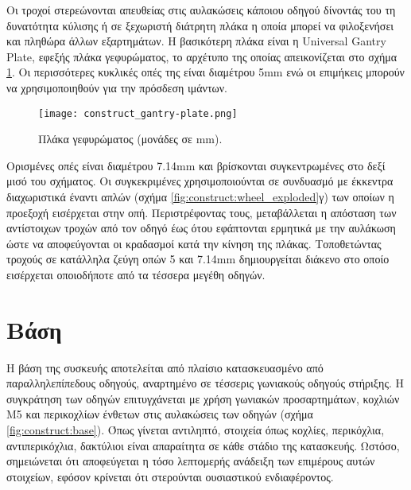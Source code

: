 Οι τροχοί στερεώνονται απευθείας στις αυλακώσεις κάποιου οδηγού δίνοντάς του τη
δυνατότητα κύλισης ή σε ξεχωριστή διάτρητη πλάκα η οποία μπορεί να φιλοξενήσει
και πληθώρα άλλων εξαρτημάτων. Η βασικότερη πλάκα είναι η Universal Gantry
Plate, εφεξής πλάκα γεφυρώματος, το αρχέτυπο της οποίας απεικονίζεται στο σχήμα
\ref{fig:construct:gantry-plate}. Οι περισσότερες κυκλικές οπές της είναι
διαμέτρου 5mm ενώ οι επιμήκεις μπορούν να χρησιμοποιηθούν για την πρόσδεση
ιμάντων.

\begin{figure}
    \caption[Πλάκα γεφυρώματος]{Πλάκα γεφυρώματος (μονάδες σε mm).
    \label{fig:construct:gantry-plate}}
    \begin{center}%
    \texttt{[image: construct\_gantry-plate.png]}%
    \end{center}

\end{figure}

Ορισμένες οπές είναι διαμέτρου 7.14mm και βρίσκονται συγκεντρωμένες στο δεξί
μισό του σχήματος.
Οι συγκεκριμένες χρησιμοποιούνται σε συνδυασμό με έκκεντρα διαχωριστικά έναντι
απλών (σχήμα \ref{fig:construct:wheel_exploded}γ) των οποίων η προεξοχή
εισέρχεται στην οπή. Περιστρέφοντας τους, μεταβάλλεται η απόσταση των
αντίστοιχων τροχών από τον οδηγό έως ότου εφάπτονται ερμητικά με την αυλάκωση
ώστε να αποφεύγονται οι κραδασμοί κατά την κίνηση της πλάκας.
Τοποθετώντας τροχούς σε κατάλληλα ζεύγη οπών 5 και 7.14mm δημιουργείται διάκενο
στο οποίο εισέρχεται οποιοδήποτε από τα τέσσερα μεγέθη οδηγών.


\section{Βάση}

\label{sec:construct:base}
Η βάση της συσκευής αποτελείται από πλαίσιο κατασκευασμένο από παραλληλεπίπεδους
οδηγούς, αναρτημένο σε τέσσερις γωνιακούς οδηγούς στήριξης. Η συγκράτηση των
οδηγών επιτυγχάνεται με χρήση γωνιακών προσαρτημάτων, κοχλιών M5 και περικοχλίων
ένθετων στις αυλακώσεις των οδηγών (σχήμα \ref{fig:construct:base}). Όπως
γίνεται αντιληπτό, στοιχεία όπως κοχλίες, περικόχλια, αντιπερικόχλια, δακτύλιοι
 είναι απαραίτητα σε κάθε στάδιο της κατασκευής. Ωστόσο, σημειώνεται ότι
αποφεύγεται η τόσο λεπτομερής ανάδειξη των επιμέρους αυτών στοιχείων, εφόσον
κρίνεται ότι στερούνται ουσιαστικού ενδιαφέροντος.

